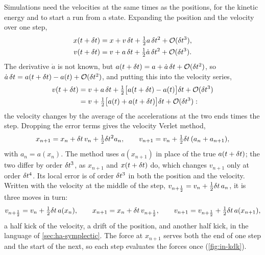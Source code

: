 Simulations need the velocities at the same times as the positions, for
the kinetic energy and to start a run from a state. Expanding the
position and the velocity over one step,
\begin{align*}
   x(t + \delta t) &= x + v\,\delta t + \tfrac12 a\,\delta t^2 + \mathcal{O}(\delta t^3) ,\\
   v(t + \delta t) &= v + a\,\delta t + \tfrac12\dot{a}\,\delta t^2 + \mathcal{O}(\delta t^3) .
\end{align*}
The derivative $\dot{a}$ is not known, but $a(t + \delta t) = a + \dot{a}\,\delta t
+ \mathcal{O}(\delta t^2)$, so $\dot{a}\,\delta t = a(t + \delta t) - a(t) + \mathcal{O}(\delta t^2)$,
and putting this into the velocity series,
\begin{align*}
   v(t + \delta t) &= v + a\,\delta t + \tfrac12\bigl[a(t + \delta t) - a(t)\bigr]\delta t +
   \mathcal{O}(\delta t^3)\\
   &= v + \tfrac12\bigl[a(t) + a(t + \delta t)\bigr]\delta t + \mathcal{O}(\delta t^3) :
\end{align*}
the velocity changes by the average of the accelerations at the two ends
times the step. Dropping the error terms gives the velocity Verlet
method\cite{Swope1982},
\begin{equation}
   x_{n+1} = x_n + \delta t\,v_n + \tfrac12\delta t^2a_n , \qquad
   v_{n+1} = v_n + \tfrac12\delta t\,(a_n + a_{n+1}) ,
   \label{eq:in-vv}
\end{equation}
with $a_n = a(x_n)$. The method uses $a(x_{n+1})$ in place of the true
$a(t + \delta t)$; the two differ by order $\delta t^3$, as $x_{n+1}$ and $x(t +
\delta t)$ do, which changes $v_{n+1}$ only at order $\delta t^4$. Its local error
is of order $\delta t^3$ in both the position and the velocity. Written with the velocity at the middle of the
step, $v_{n+\frac12} = v_n + \frac12\delta t\,a_n$, it is three moves in turn:
\begin{equation}
   v_{n+\frac12} = v_n + \tfrac12\delta t\,a(x_n) , \qquad
   x_{n+1} = x_n + \delta t\,v_{n+\frac12} , \qquad
   v_{n+1} = v_{n+\frac12} + \tfrac12\delta t\,a(x_{n+1}) ,
   \label{eq:in-kdk}
\end{equation}
a half kick of the velocity, a drift of the position, and another half
kick, in the language of \cref{sec:ha-symplectic}. The force at
$x_{n+1}$ serves both the end of one step and the start of the next, so
each step evaluates the forces once (\cref{fig:in-kdk}).

